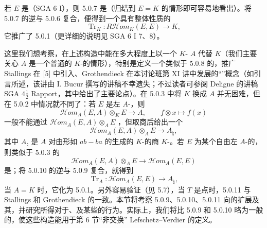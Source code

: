 若 $E$ 是（SGA 6 I），则 5.0.7 是（归结到 $E=K$ 的情形即可容易地看出）。将 5.0.7 的逆与 5.0.6 复合，便得到一个具有整体性质的
\begin{equation}\operatorname{Tr}_K:R\mathcal{H}\!om_K(E,E)\longrightarrow K,\tag{5.0.8}\end{equation}
它推广了 5.0.1（更详细的说明见 SGA 6 I 7、8）。

这里我们想考察，在上述构造中能在多大程度上以一个 $K$- $A$ 代替 $K$（我们主要关心 $A$ 是一个普通的 $K$-的情形），特别是定义一个类似于 5.0.8 的，推广 Stallings 在 [5] 中引入、Grothendieck 在本讨论班第 XI 讲中发展的“”概念（如引言所述，该讲由 I. Bucur 撰写的讲稿不幸遗失；不过读者可参阅 Deligne 的讲稿 SGA $4\frac12$ Rapport，其中给出了主要论点）。在 5.0.3 中将 $K$ 换成 $A$ 并无困难，但在 5.0.2 中情况就不同了：若 $E$ 是左 $A$-，则
\[\mathcal{H}\!om_A(E,A)\otimes_K E\longrightarrow A,\qquad f\otimes x\longmapsto f(x)\]
一般不能通过 $\mathcal{H}\!om_A(E,A)\otimes_A E$ ，但取商后给出一个
\begin{equation}\mathcal{H}\!om_A(E,A)\otimes_A E\longrightarrow A_\natural,\tag{5.0.9}\end{equation}
其中 $A_\natural$ 是 $A$ 对由形如 $ab-ba$ 的生成的 $K$-的商 $K$-。若 $E$ 为某个自由左 $A$-的，则类似于 5.0.3 的
\begin{equation}\mathcal{H}\!om_A(E,A)\otimes_A E\longrightarrow\mathcal{H}\!om_A(E,E)\tag{5.0.10}\end{equation}
是；将 5.0.10 的逆与 5.0.9 复合，就得到
\begin{equation}\operatorname{Tr}_A:\mathcal{H}\!om_A(E,E)\longrightarrow A_\natural,\tag{5.0.11}\end{equation}
当 $A=K$ 时，它化为 5.0.1。另外容易验证（见 5.7），当 $T$ 是点时，5.0.11 与 Stallings 和 Grothendieck 的一致。本节将考察 5.0.9、5.0.10、5.0.11 向的扩展及其，并研究所得对于、及某些的行为。实际上，我们将比 5.0.9 和 5.0.10 略为一般的，使这些构造能用于第 6 节“非交换” Lefschetz--Verdier 的定义。

